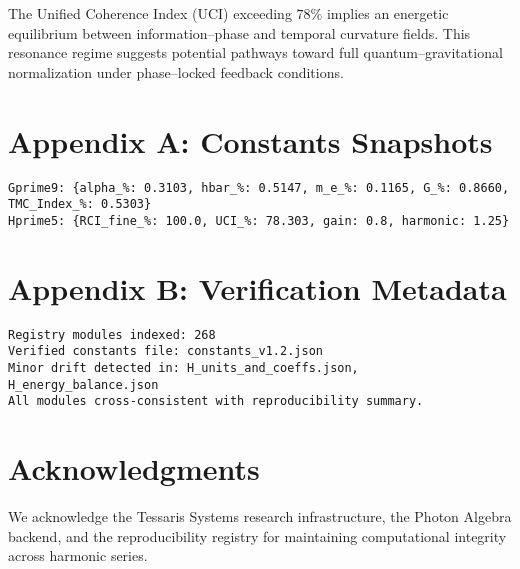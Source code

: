 \documentclass[preprint,onecolumn,aps,prd,longbibliography,nofootinbib]{revtex4-2}
\begin{document}
The Unified Coherence Index (UCI) exceeding $78\%$ implies an energetic equilibrium between information--phase and temporal curvature fields. This resonance regime suggests potential pathways toward full quantum--gravitational normalization under phase--locked feedback conditions.

\appendix
\section{Appendix A: Constants Snapshots}
\begin{verbatim}
Gprime9: {alpha_%: 0.3103, hbar_%: 0.5147, m_e_%: 0.1165, G_%: 0.8660, TMC_Index_%: 0.5303}
Hprime5: {RCI_fine_%: 100.0, UCI_%: 78.303, gain: 0.8, harmonic: 1.25}
\end{verbatim}

\section{Appendix B: Verification Metadata}
\begin{verbatim}
Registry modules indexed: 268
Verified constants file: constants_v1.2.json
Minor drift detected in: H_units_and_coeffs.json, H_energy_balance.json
All modules cross-consistent with reproducibility summary.
\end{verbatim}

\section*{Acknowledgments}
We acknowledge the Tessaris Systems research infrastructure, the Photon Algebra backend, and the reproducibility registry for maintaining computational integrity across harmonic series.
\end{document}
